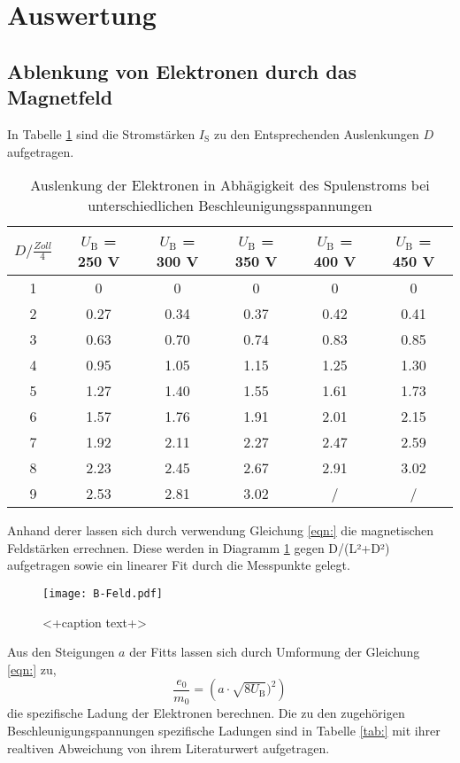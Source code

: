\section{Auswertung}
\label{sec:Auswertung}
\subsection{Ablenkung von Elektronen durch das Magnetfeld}
In Tabelle \ref{tab:DIS} sind die Stromstärken $I_\text{S}$ zu den Entsprechenden Auslenkungen $D$ aufgetragen.
\begin{table}
  \centering
  \begin{tabular}{c| c c c c c }
    \toprule
    $D / \frac{Zoll}{4}$ & $U_\text{B}$ = 250 V & $U_\text{B}$ = 300 V & $U_\text{B}$ = 350 V & $U_\text{B}$ = 400 V & $U_\text{B}$ = 450 V \\
    \midrule
    1 &	0	&0	&0	&0	&0	\\
    2 &	0.27	&0.34	&0.37	&0.42	&0.41	\\
    3 &	0.63	&0.70	&0.74	&0.83	&0.85	\\
    4 &	0.95	&1.05	&1.15	&1.25	&1.30	\\	
    5 &	1.27	&1.40	&1.55	&1.61	&1.73	\\
    6 &	1.57	&1.76	&1.91	&2.01	&2.15	\\
    7 &	1.92	&2.11 	&2.27	&2.47	&2.59	\\
    8 &	2.23	&2.45	&2.67	&2.91	&3.02	\\
    9 &	2.53	&2.81	&3.02	&/	&/	\\
    \bottomrule
  \end{tabular}
  \caption{Auslenkung der Elektronen in Abhägigkeit des Spulenstroms bei unterschiedlichen Beschleunigungsspannungen}
  \label{tab:DIS}
\end{table}
Anhand derer lassen sich durch verwendung Gleichung \eqref{eqn:} die magnetischen Feldstärken errechnen. Diese werden in Diagramm \ref{fig:bfeld} gegen D/(L²+D²) aufgetragen sowie ein linearer Fit durch die Messpunkte gelegt. 
\begin{figure}
  \centering
  \texttt{[image: B-Feld.pdf]}
  \caption{<+caption text+>}
  \label{fig:bfeld}
\end{figure}
Aus den Steigungen $a$ der Fitts lassen sich durch Umformung der Gleichung \eqref{eqn:} zu,
\begin{equation}
  \frac{e_0}{m_0} = \left( a \cdot \sqrt{8 U_\text{B}} )^2 \right)
  \label{eqn:e0m0}
\end{equation}
die spezifische Ladung der Elektronen berechnen. Die zu den zugehörigen Beschleunigungspannungen spezifische Ladungen sind in Tabelle \ref{tab:} mit ihrer realtiven Abweichung von ihrem Literaturwert  aufgetragen. 

